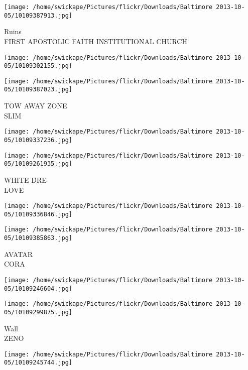 \documentclass[10pt,letterpaper]{article}
\begin{document}
\vspace{0.25in}
\texttt{[image: /home/swickape/Pictures/flickr/Downloads/Baltimore 2013-10-05/10109387913.jpg]}

Ruins\\
FIRST APOSTOLIC FAITH INSTITUTIONAL CHURCH\\
\pagebreak

\texttt{[image: /home/swickape/Pictures/flickr/Downloads/Baltimore 2013-10-05/10109302155.jpg]}

\vspace{0.25in}
\texttt{[image: /home/swickape/Pictures/flickr/Downloads/Baltimore 2013-10-05/10109387023.jpg]}

TOW AWAY ZONE\\
SLIM\\
\pagebreak

\texttt{[image: /home/swickape/Pictures/flickr/Downloads/Baltimore 2013-10-05/10109337236.jpg]}

\vspace{0.25in}
\texttt{[image: /home/swickape/Pictures/flickr/Downloads/Baltimore 2013-10-05/10109261935.jpg]}

WHITE DRE\\
LOVE\\
\pagebreak

\texttt{[image: /home/swickape/Pictures/flickr/Downloads/Baltimore 2013-10-05/10109336846.jpg]}

\vspace{0.25in}
\texttt{[image: /home/swickape/Pictures/flickr/Downloads/Baltimore 2013-10-05/10109385863.jpg]}

AVATAR\\
CORA\\
\pagebreak

\texttt{[image: /home/swickape/Pictures/flickr/Downloads/Baltimore 2013-10-05/10109246604.jpg]}

\vspace{0.25in}
\texttt{[image: /home/swickape/Pictures/flickr/Downloads/Baltimore 2013-10-05/10109299875.jpg]}

Wall\\
ZENO\\
\pagebreak

\texttt{[image: /home/swickape/Pictures/flickr/Downloads/Baltimore 2013-10-05/10109245744.jpg]}
\end{document}
